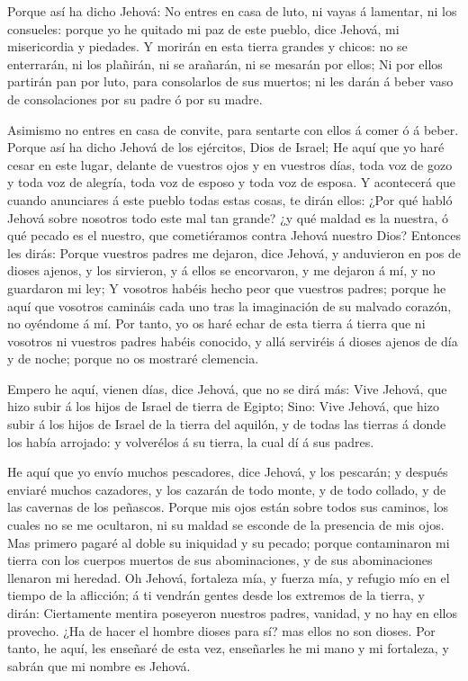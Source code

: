  Porque así ha dicho Jehová: No entres en casa de luto, ni
vayas á lamentar, ni los consueles: porque yo he quitado mi paz de este
pueblo, dice Jehová, mi misericordia y piedades.  Y morirán
en esta tierra grandes y chicos: no se enterrarán, ni los plañirán, ni
se arañarán, ni se mesarán por ellos;  Ni por ellos partirán
pan por luto, para consolarlos de sus muertos; ni les darán á beber vaso
de consolaciones por su padre ó por su madre.

 Asimismo no entres en casa de convite, para sentarte con
ellos á comer ó á beber.  Porque así ha dicho Jehová de los
ejércitos, Dios de Israel; He aquí que yo haré cesar en este lugar,
delante de vuestros ojos y en vuestros días, toda voz de gozo y toda voz
de alegría, toda voz de esposo y toda voz de esposa.  Y
acontecerá que cuando anunciares á este pueblo todas estas cosas, te
dirán ellos: ¿Por qué habló Jehová sobre nosotros todo este mal tan
grande? ¿y qué maldad es la nuestra, ó qué pecado es el nuestro, que
cometiéramos contra Jehová nuestro Dios?  Entonces les
dirás: Porque vuestros padres me dejaron, dice Jehová, y anduvieron en
pos de dioses ajenos, y los sirvieron, y á ellos se encorvaron, y me
dejaron á mí, y no guardaron mi ley;  Y vosotros habéis
hecho peor que vuestros padres; porque he aquí que vosotros camináis
cada uno tras la imaginación de su malvado corazón, no oyéndome á mí.
 Por tanto, yo os haré echar de esta tierra á tierra que ni
vosotros ni vuestros padres habéis conocido, y allá serviréis á dioses
ajenos de día y de noche; porque no os mostraré clemencia.

 Empero he aquí, vienen días, dice Jehová, que no se dirá
más: Vive Jehová, que hizo subir á los hijos de Israel de tierra de
Egipto;  Sino: Vive Jehová, que hizo subir á los hijos de
Israel de la tierra del aquilón, y de todas las tierras á donde los
había arrojado: y volverélos á su tierra, la cual dí á sus padres.

 He aquí que yo envío muchos pescadores, dice Jehová, y los
pescarán; y después enviaré muchos cazadores, y los cazarán de todo
monte, y de todo collado, y de las cavernas de los peñascos.
 Porque mis ojos están sobre todos sus caminos, los cuales
no se me ocultaron, ni su maldad se esconde de la presencia de mis ojos.
 Mas primero pagaré al doble su iniquidad y su pecado;
porque contaminaron mi tierra con los cuerpos muertos de sus
abominaciones, y de sus abominaciones llenaron mi heredad. 
Oh Jehová, fortaleza mía, y fuerza mía, y refugio mío en el tiempo de la
aflicción; á ti vendrán gentes desde los extremos de la tierra, y dirán:
Ciertamente mentira poseyeron nuestros padres, vanidad, y no hay en
ellos provecho.  ¿Ha de hacer el hombre dioses para sí? mas
ellos no son dioses.  Por tanto, he aquí, les enseñaré de
esta vez, enseñarles he mi mano y mi fortaleza, y sabrán que mi nombre
es Jehová.

